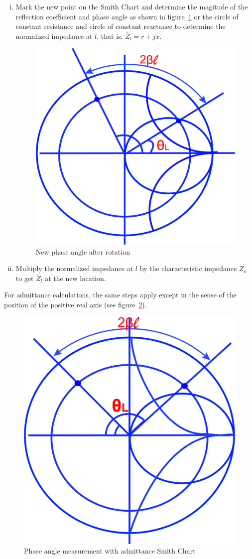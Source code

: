 \begin{enumerate}[(i)]
\item Mark the new point on the Smith Chart and determine the magitude of the reflection coefficient and phase angle as shown in figure~\ref{fig:uyhbgjvkclxse} or the circle of constant resistance and circle of constant reactance to determine the normalized impedance at $l$, that is, $\bar{Z}_{l} = r + jx$.
\begin{figure}[h]
\centering
\includegraphics[width=0.7\linewidth]{./graphics/uyhbgjvkclxse}
\caption{New phase angle after rotation}
\label{fig:uyhbgjvkclxse}
\end{figure}

\item Multiply the normalized impedance at $l$ by the characteristic impedance $Z_o$ to get $\bar{Z}_{l}$ at the new location.
\end{enumerate}

For admittance calculations, the same steps apply except in the sense of the position of the positive real axis (see figure~\ref{fig:dfyui}).
\begin{figure}[h]
\centering
\includegraphics[width=0.7\linewidth]{./graphics/dfyui}
\caption{Phase angle measurement with admittance Smith Chart}
\label{fig:dfyui}
\end{figure}


